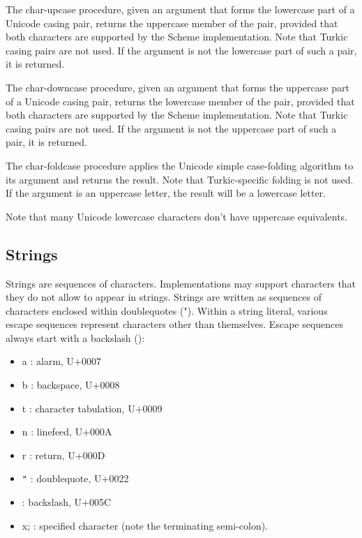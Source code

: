 \begin{entry}{%
}


The {\cf char-upcase} procedure, given an argument that forms the
lowercase part of a Unicode casing pair, returns the uppercase member
of the pair, provided that both characters are supported by the Scheme
implementation.  Note that Turkic casing pairs are not used.  If the
argument is not the lowercase part of such a pair, it is returned.

The {\cf char-downcase} procedure, given an argument that forms the
uppercase part of a Unicode casing pair, returns the lowercase member
of the pair, provided that both characters are supported by the Scheme
implementation.  Note that Turkic casing pairs are not used.  If the
argument is not the uppercase part of such a pair, it is returned.

The {\cf char-foldcase} procedure applies the Unicode simple
case-folding algorithm to its argument and returns the result.  Note that
Turkic-specific folding is not used.  If the argument is an uppercase
letter, the result will be a lowercase letter.

Note that many Unicode lowercase characters don't have uppercase
equivalents.

\end{entry}


\subsection{Strings}
\label{stringsection}

Strings are sequences of characters.  
Implementations may support characters that they do not allow to appear
in strings.
\vest Strings are written as sequences of characters enclosed within doublequotes
({\cf "}).  Within a string literal, various escape
sequences represent characters other than
themselves.  Escape sequences always start with a backslash (\backwhack{}):

\begin{itemize}
\item{\cf\backwhack{}a} : alarm, U+0007
\item{\cf\backwhack{}b} : backspace, U+0008 
\item{\cf\backwhack{}t} : character tabulation, U+0009 
\item{\cf\backwhack{}n} : linefeed, U+000A 
\item{\cf\backwhack{}r} : return, U+000D 
\item{\cf\backwhack{}}\verb|"| : doublequote, U+0022 
\item{\cf\backwhack{}\backwhack{}} : backslash, U+005C 
\item{\cf\backwhack{}x;} : specified character (note the
  terminating semi-colon).
\end{itemize}

